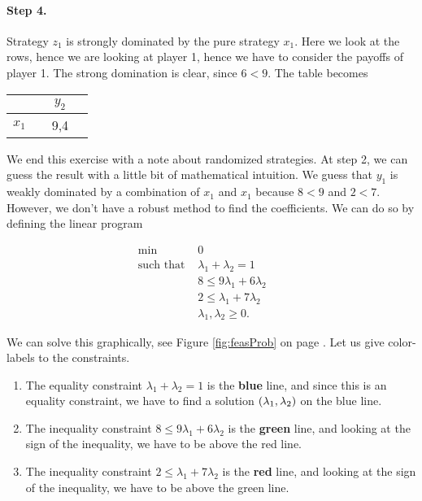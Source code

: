 \paragraph{Step 4.} Strategy $z_{1}$ is strongly dominated by the pure strategy $x_{1}$. Here we look at the rows, hence we are looking at player 1, hence we have to consider the payoffs of player 1. The strong domination is clear, since $6 < 9$. The table becomes

\begin{tabular}[h!]{l|ccc}
		&& $y_2$ \\
		\hline
		$x_1$ && 9,4 &
	\end{tabular} 
	

\vspace{10mm}

We end this exercise with a note about randomized strategies. At step 2, we can guess the result with a little bit of mathematical intuition. We guess that $y_1$ is weakly dominated by a combination of $x_{1}$ and $x_{1}$ because $8 < 9$ and $2 < 7$. However, we don't have a robust method to find the coefficients. We can do so by defining the linear program


        

\begin{equation*}
    \begin{aligned}
    \underset{}{\text{min }} &
    0 & & \\
    \text{such that  } &
        \lambda_{1} + \lambda_{2} = 1 & \\
        & 8 \leq 9 \lambda_{1} + 6 \lambda_{2} &  \\
        & 2 \leq \lambda_{1} + 7 \lambda_{2} & \\
        & \lambda_{1}, \lambda_{2} \geq 0. &
    \end{aligned}
\end{equation*}
   

We can solve this graphically, see Figure \ref{fig:feasProb} on page \pageref{fig:feasProb}. Let us give color-labels to the constraints.
\begin{enumerate}
    \item The equality constraint $\lambda_{1} + \lambda_{2} = 1$ is the \textbf{blue} line, and since this is an equality constraint, we have to find a solution $\left(\lambda_{1}, \lambda_{2}\right)$ on the blue line.
    \item The inequality constraint $8 \leq 9 \lambda_{1} + 6 \lambda_{2}$ is the \textbf{green} line, and looking at the sign of the inequality, we have to be above the red line.
    \item The inequality constraint $2 \leq \lambda_{1} + 7 \lambda_{2}$ is the \textbf{red} line, and looking at the sign of the inequality, we have to be above the green line.
\end{enumerate}


